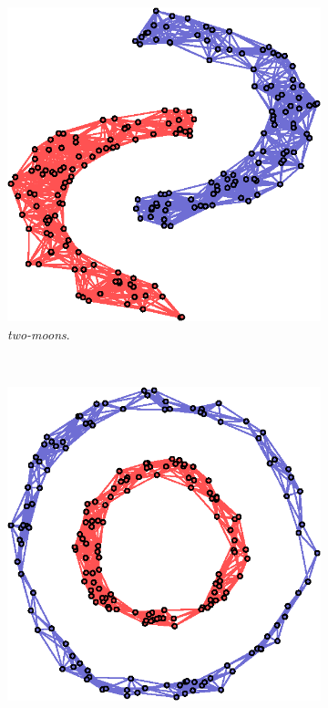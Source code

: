\begin{figure}[!htb]
    \centering
    \begin{subfigure}[b]{0.23\textwidth}
      \includegraphics[width=\textwidth]{clusters/latex/figures/twomoon.eps}
      \caption{\textit{two-moons}.}
    \end{subfigure}
    ~
    \begin{subfigure}[b]{0.23\textwidth}
      \includegraphics[width=\textwidth]{clusters/latex/figures/circles2.eps}

\end{subfigure}
\end{figure}
